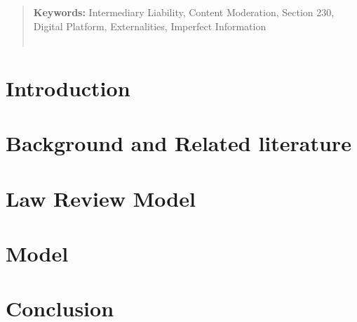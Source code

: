 \documentclass[openbib,12pt]{article}  %
\begin{document}
\begin{abstract}
\vspace{0in}
\noindent\textbf{Keywords:} Intermediary Liability, Content Moderation, Section 230, Digital Platform, Externalities, Imperfect Information \\
\vspace{0in}\\
\bigskip
\end{abstract}

\newpage

\section{Introduction}\label{EMIL_Section:intro}


\section{Background and Related literature}\label{EMIL_Section:inst}



\section{Law Review Model}\label{EMIL_Section:lawreview}


\section{Model}\label{EMIL_Section:model}


%

\section{Conclusion}\label{EMIL_Section:conclude}


\newpage
\appendix
\label{Appendix:proofs}
\end{document}
